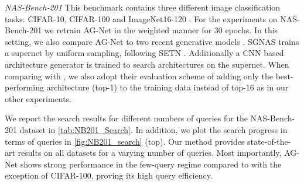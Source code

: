 \documentclass[runningheads]{llncs}
\begin{document}
\noindent \textit{NAS-Bench-201}
This benchmark contains three different image classification tasks:
CIFAR-10, CIFAR-100 \cite{2009CIFAR} and ImageNet16-120 \cite{2017ImageNet16}.
For the experiments on NAS-Bench-201\cite{2020NB201} we retrain AG-Net in the weighted manner for $30$ epochs.
In this setting, we also compare AG-Net to two recent generative models \cite{2021GANAS,2021SGNAS}.
SGNAS \cite{2021SGNAS} trains a supernet by uniform sampling, following SETN \cite{2019SETN}. Additionally a CNN based architecture generator is trained to search architectures on the supernet.
When comparing with \cite{2020Arch2vec}, we also adopt their evaluation scheme of adding only the best-performing architecture (top-1) to the training data instead of top-16 as in our other experiments.

We report the search results for different numbers of queries for the NAS-Bench-201 dataset in \autoref{tab:NB201_Search}.
In addition, we plot the search progress in terms of queries in \autoref{fig:NB201_search} (top).
Our method provides state-of-the-art results on all datasets for a varying number of queries.
Most importantly, AG-Net shows strong performance in the few-query regime compared to \cite{2020Arch2vec} with the exception of CIFAR-100, proving its high query efficiency.
\end{document}
